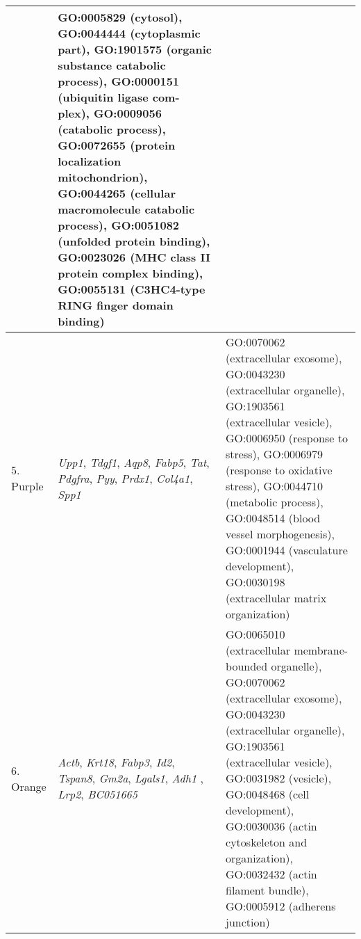 \begin{table}[!hp]
\begin{adjustwidth}{-.50in}{0in}
\begin{tabular}{|p{1.0in}|p{1.5in}|p{4.3in}|}
& GO:0005829 (cytosol), GO:0044444 (cytoplasmic part), GO:1901575 (organic substance catabolic process), GO:0000151 (ubiquitin ligase com- plex),  GO:0009056 (catabolic process), GO:0072655 (protein localization mitochondrion), GO:0044265 (cellular macromolecule catabolic process), GO:0051082 (unfolded protein binding), GO:0023026 (MHC class II protein complex binding), GO:0055131 (C3HC4-type RING finger domain binding) \\ 
\hline
5. Purple & \textit{Upp1}, \textit{Tdgf1}, \textit{Aqp8}, \textit{Fabp5}, \textit{Tat}, \textit{Pdgfra}, \textit{Pyy}, \textit{Prdx1}, \textit{Col4a1}, \textit{Spp1}
& GO:0070062 (extracellular exosome), GO:0043230 (extracellular organelle), GO:1903561 (extracellular vesicle), GO:0006950 (response to stress), GO:0006979 (response to oxidative stress), GO:0044710 (metabolic process), GO:0048514 (blood vessel morphogenesis), GO:0001944 (vasculature development), GO:0030198 (extracellular matrix organization) \\ 
\hline
6. Orange & \textit{Actb}, \textit{Krt18}, \textit{Fabp3}, \textit{Id2}, \textit{Tspan8}, \textit{Gm2a}, \textit{Lgals1}, \textit{Adh1}
, \textit{Lrp2}, \textit{BC051665}
& GO:0065010 (extracellular membrane-bounded organelle), GO:0070062 (extracellular exosome),  GO:0043230 (extracellular organelle), GO:1903561 (extracellular vesicle), GO:0031982 (vesicle), GO:0048468 (cell development), GO:0030036 (actin cytoskeleton and organization), GO:0032432 (actin filament bundle),  GO:0005912 (adherens junction)\\ 
\hline
\end{tabular} \label{tab:tab3}
\end{adjustwidth}
 \end{table}



